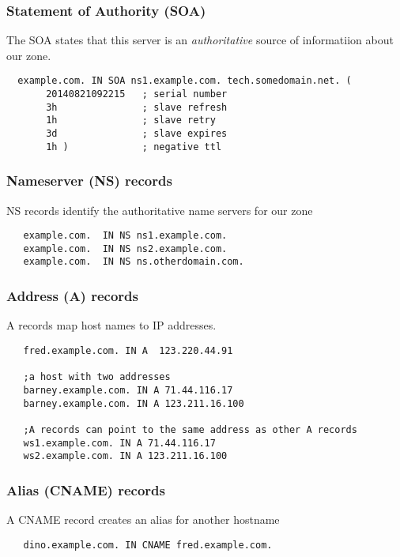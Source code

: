\documentclass[10pt]{beamer}
\begin{document}
\begin{frame}[fragile]
  \frametitle{Statement of Authority (SOA)}
 The SOA states that this server is an \emph{authoritative} source of informatiion about our zone.
 \begin{verbatim}
  example.com. IN SOA ns1.example.com. tech.somedomain.net. (
       20140821092215	; serial number
       3h               ; slave refresh 
       1h               ; slave retry
       3d               ; slave expires
       1h )             ; negative ttl
 \end{verbatim}
\end{frame}


\begin{frame}[fragile]
  \frametitle{Nameserver (NS) records}
 NS records identify the authoritative name servers for our zone
 \begin{verbatim}
   example.com.  IN NS ns1.example.com.
   example.com.  IN NS ns2.example.com.
   example.com.  IN NS ns.otherdomain.com.
 \end{verbatim}

\end{frame}


\begin{frame}[fragile]
  \frametitle{Address (A) records}
 A records map host names to IP addresses.
 \begin{verbatim}
   fred.example.com. IN A  123.220.44.91

   ;a host with two addresses
   barney.example.com. IN A 71.44.116.17
   barney.example.com. IN A 123.211.16.100

   ;A records can point to the same address as other A records
   ws1.example.com. IN A 71.44.116.17
   ws2.example.com. IN A 123.211.16.100
 \end{verbatim}

\end{frame}


\begin{frame}[fragile]
  \frametitle{Alias (CNAME) records}

 A CNAME record creates an alias for another hostname
 \begin{verbatim}
   dino.example.com. IN CNAME fred.example.com. 
 \end{verbatim}

\end{frame}
\end{document}
